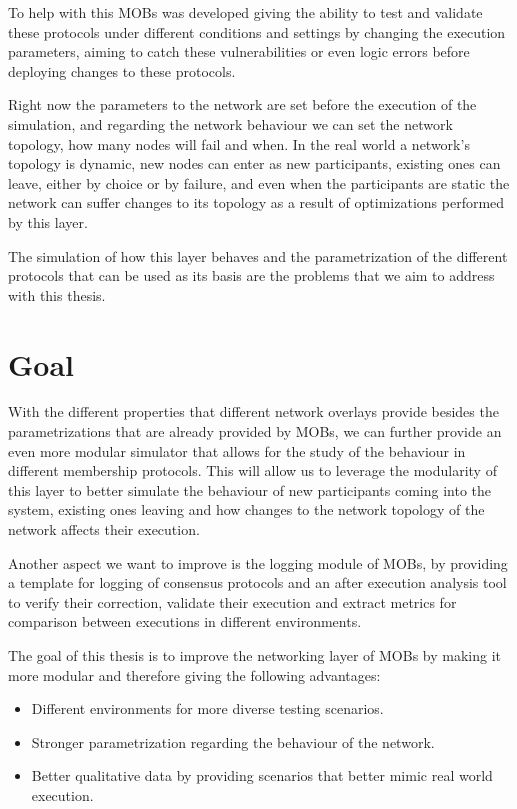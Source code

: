 To help with this MOBs was developed giving the ability to test and validate these protocols under different conditions and settings by 
changing the execution parameters, aiming to catch these vulnerabilities or even logic errors before deploying changes to these protocols.

Right now the parameters to the network are set before the execution of the simulation, and regarding the network behaviour we can
set the network topology, how many nodes will fail and when. In the real world a network's topology is dynamic, new nodes can enter
as new participants, existing ones can leave, either by choice or by failure, and even when the participants are static the network
can suffer changes to its topology as a result of optimizations performed by this layer.

The simulation of how this layer behaves and the parametrization of the different protocols that can be used as its basis are the
problems that we aim to address with this thesis.


\section{Goal}\label{sub:goal}

With the different properties that different network overlays provide besides the parametrizations that are already provided by MOBs,
we can further provide an even more modular simulator that allows for the study of the behaviour in different membership protocols.
This will allow us to leverage the modularity of this layer to better simulate the behaviour of new participants coming into the system, existing
ones leaving and how changes to the network topology of the network affects their execution.

Another aspect we want to improve is the logging module of MOBs, by providing a template for logging of consensus protocols and
an after execution analysis tool to verify their correction, validate their execution and extract metrics for
comparison between executions in different environments.

The goal of this thesis is to improve the networking layer of MOBs by making it more modular and therefore giving the following advantages:
\begin{itemize}
  \item Different environments for more diverse testing scenarios.
  \item Stronger parametrization regarding the behaviour of the network.
  \item Better qualitative data by providing scenarios that better mimic real world execution.
\end{itemize}

